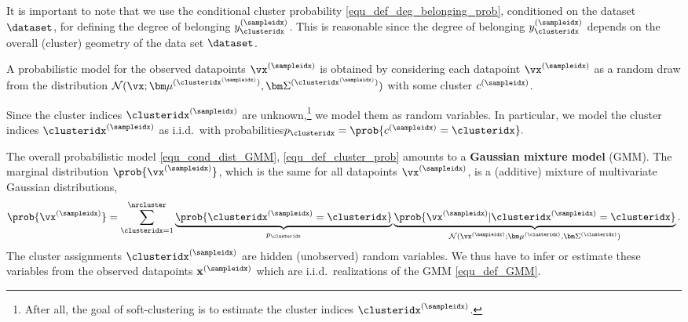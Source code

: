 \documentclass[12pt]{report}
\begin{document}
It is important to note that we use the conditional cluster 
probability \eqref{equ_def_deg_belonging_prob}, conditioned 
on the dataset $\dataset$, for defining the degree of belonging $y^{(\sampleidx)}_{\clusteridx}$. 
This is reasonable since the degree of belonging $y^{(\sampleidx)}_{\clusteridx}$ 
depends on the overall (cluster) geometry of the data set $\dataset$.

A probabilistic model for the observed datapoints $\vx^{(\sampleidx)}$ 
is obtained by considering each datapoint $\vx^{(\sampleidx)}$ as a 
random draw from the distribution $\mathcal{N} (\vx ; {\bm \mu}^{(\clusteridx^{(\sampleidx)})}, {\bm \Sigma}^{(\clusteridx^{(\sampleidx)})})$ with some cluster $c^{(\sampleidx)}$. 

Since the cluster indices $\clusteridx^{(\sampleidx)}$ are unknown,\footnote{After all, the goal 
of soft-clustering is to estimate the cluster indices $\clusteridx^{(\sampleidx)}$.} 
we model them as random variables. In particular, we model the cluster indices 
$\clusteridx^{(\sampleidx)}$ as i.i.d.\ with probabilities$p_{\clusteridx} = \prob{ c^{(\sampleidx)} = \clusteridx}.$ 

The overall probabilistic model \eqref{equ_cond_dist_GMM}, \eqref{equ_def_cluster_prob} 
amounts to a {\bf Gaussian mixture model} (GMM). The marginal distribution $\prob{\vx^{(\sampleidx)}}$, 
which is the same for all datapoints $\vx^{(\sampleidx)}$, is a (additive) mixture of 
multivariate Gaussian distributions, 
\begin{equation} 
\label{equ_def_GMM}
 \prob{\vx^{(\sampleidx)}} = \sum_{\clusteridx=1}^{\nrcluster} \underbrace{\prob{\clusteridx^{(\sampleidx)}=\clusteridx}}_{p_{\clusteridx}}  \underbrace{\prob{\vx^{(\sampleidx)} | \clusteridx^{(\sampleidx)}=\clusteridx}}_{\mathcal{N}(\vx^{(\sampleidx)};{\bm \mu}^{(\clusteridx)}, {\bm \Sigma}^{(\clusteridx)})}. 
\end{equation} 
The cluster assignments $\clusteridx^{(\sampleidx)}$ are hidden (unobserved) random 
variables. We thus have to infer or estimate these variables from the observed 
datapoints $\mathbf{x}^{(\sampleidx)}$ which are i.i.d.\ realizations of the GMM \eqref{equ_def_GMM}. 
\end{document}
